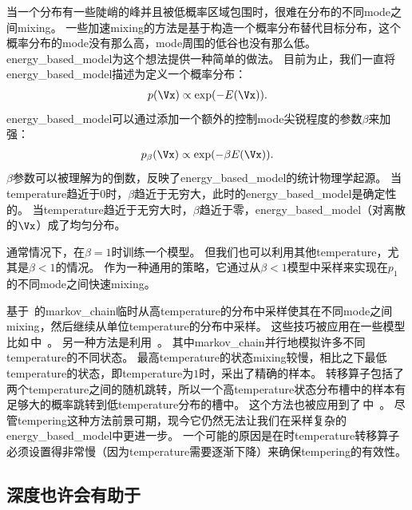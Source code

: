 当一个分布有一些陡峭的峰并且被低概率区域包围时，很难在分布的不同\gls{mode}之间\gls{mixing}。   %
一些加速\gls{mixing}的方法是基于构造一个概率分布替代目标分布，这个概率分布的\gls{mode}没有那么高，\gls{mode}周围的低谷也没有那么低。
\gls{energy_based_model}为这个想法提供一种简单的做法。
目前为止，我们一直将\gls{energy_based_model}描述为定义一个概率分布：   
\begin{align}
\label{eqn:1725}
p(\Vx) \propto \exp(-E(\Vx)).
\end{align}
\gls{energy_based_model}可以通过添加一个额外的控制\gls{mode}尖锐程度的参数$\beta$来加强：
\begin{align}
\label{eqn:1726}
p_{\beta}(\Vx) \propto \exp(-\beta E(\Vx)).
\end{align}
$\beta$参数可以被理解为的倒数，反映了\gls{energy_based_model}的统计物理学起源。
当\gls{temperature}趋近于0时，$\beta$趋近于无穷大，此时的\gls{energy_based_model}是确定性的。
当\gls{temperature}趋近于无穷大时，$\beta$趋近于零，\gls{energy_based_model}（对离散的$\Vx$）成了均匀分布。

通常情况下，在$\beta = 1$时训练一个模型。
但我们也可以利用其他\gls{temperature}，尤其是$\beta < 1$的情况。
作为一种通用的策略，它通过从$\beta<1$模型中采样来实现在$p_1$的不同\gls{mode}之间快速\gls{mixing}。

基于~\citep{Neal94b}的\gls{markov_chain}临时从高\gls{temperature}的分布中采样使其在不同\gls{mode}之间\gls{mixing}，然后继续从单位\gls{temperature}的分布中采样。
这些技巧被应用在一些模型比如\,中~\citep{Salakhutdinov-2010}。
另一种方法是利用~\citep{Iba-2001}。
其中\gls{markov_chain}并行地模拟许多不同\gls{temperature}的不同状态。
最高\gls{temperature}的状态\gls{mixing}较慢，相比之下最低\gls{temperature}的状态，即\gls{temperature}为$1$时，采出了精确的样本。
转移算子包括了两个\gls{temperature}之间的随机跳转，所以一个高\gls{temperature}状态分布槽中的样本有足够大的概率跳转到低\gls{temperature}分布的槽中。
这个方法也被应用到了\,中~\citep{Desjardins+al-2010-small,Cho10IJCNN}。
尽管\gls{tempering}这种方法前景可期，现今它仍然无法让我们在采样复杂的\gls{energy_based_model}中更进一步。
一个可能的原因是在时\gls{temperature}转移算子必须设置得非常慢（因为\gls{temperature}需要逐渐下降）来确保\gls{tempering}的有效性。


\subsection{深度也许会有助于}
\label{sec:depth_may_help_mixing}

